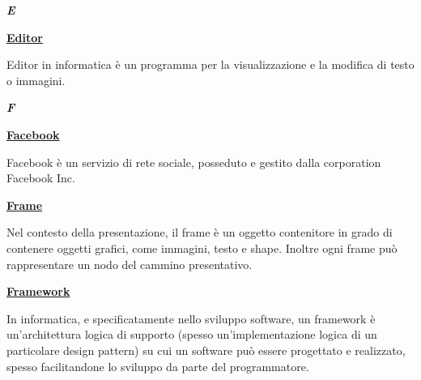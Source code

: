 \newpage

\cleardoublepage
{}
{}
\noindent\hrulefill\hspace{4mm}\textbf{\textsl{\Huge{E}}}\hspace{4mm}\hrulefill
\vspace*{2\bigskipamount}

\begin{addmargin}[0em]{0em}
	\textbf{\underline{Editor}} 
\end{addmargin}
	
\medskip
\begin{addmargin}[5em]{1em}	
Editor in informatica è un programma per la visualizzazione e la modifica di testo o immagini.
\end{addmargin}

\newpage

\cleardoublepage
{}
{}
\noindent\hrulefill\hspace{4mm}\textbf{\textsl{\Huge{F}}}\hspace{4mm}\hrulefill
\vspace*{2\bigskipamount}

\begin{addmargin}[0em]{0em}		
	\textbf{\underline{Facebook}}
\end{addmargin}
	
\medskip
\begin{addmargin}[5em]{1em}	
Facebook è un servizio di rete sociale, posseduto e gestito dalla corporation Facebook Inc.
\end{addmargin}	

\bigskip
\begin{addmargin}[0em]{0em}
	\textbf{\underline{Frame}}
\end{addmargin}

\medskip
\begin{addmargin}[5em]{1em}	
Nel contesto della presentazione, il frame è un oggetto contenitore in grado di contenere oggetti grafici, come immagini, testo e shape. Inoltre ogni frame può rappresentare un nodo del cammino presentativo.
\end{addmargin}	

\bigskip
\begin{addmargin}[0em]{0em}	
	\textbf{\underline{Framework}}
\end{addmargin}

\medskip
\begin{addmargin}[5em]{1em}	
In informatica, e specificatamente nello sviluppo software, un framework è un'architettura logica di supporto (spesso un'implementazione logica di un particolare design pattern) su cui un software può essere progettato e realizzato, spesso facilitandone lo sviluppo da parte del programmatore.
\end{addmargin}	

